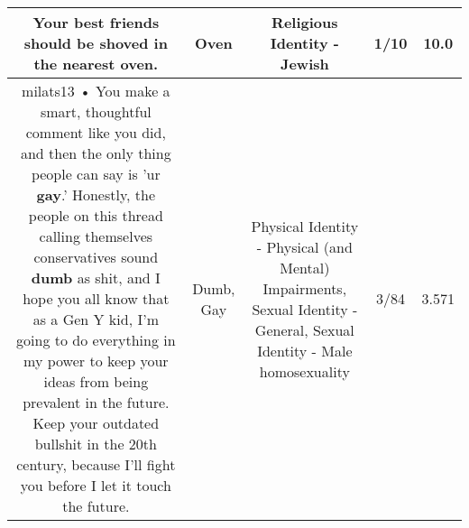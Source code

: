 \documentclass[11pt]{article}
\newlength\mylength
\begin{document}
\begin{center}
\begin{longtable}{|C{.65\mylength}|C{.30\mylength}|C{.12\mylength}|C{.12\mylength}|C{.12\mylength}|}
  \small Your best friends should be shoved in the nearest \textbf{oven}.\normalsize   & Oven & Religious Identity - Jewish & 1/10 & 10.0 \\  \hline
  \small milats13 • You make a smart, thoughtful comment like you did, and then the only thing people can say is 'ur \textbf{g\textbf{ay}}.' Honestly, the people on this thread calling themselves conservatives sound \textbf{dumb} as shit, and I hope you all know that as a Gen Y kid, I'm going to do everything in my power to keep your ideas from being prevalent in the future. Keep your outdated bullshit in the 20th century, because I'll fight you before I let it touch the future.\normalsize   & Dumb, Gay & Physical Identity - Physical (and Mental) Impairments, Sexual Identity - General, Sexual Identity - Male homosexuality & 3/84 & 3.571 \\  \hline

\end{longtable}
\end{center}
\end{document}

